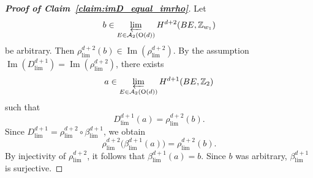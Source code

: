 \documentclass[aps,prx,reprint,superscriptaddress,twocolumn,amsmath,amssymb,amsfonts, nofootinbib]{revtex4-2}
\newcommand{\Z}{\mathbb{Z}}
\theoremstyle{apsstyle}
\begin{document}
\begin{proof}[\textnormal{\textbf{Proof of Claim~\ref{claim:imD_equal_imrho}}}]
Let
\begin{equation}
b\in  \varprojlim_{E\in\mathcal A_2(\mathrm{O}(d))} H^{d+2}(BE,\Z_{w_1})
\end{equation}
be arbitrary. Then $ \rho_{\lim}^{d+2}(b) \in \operatorname{Im}(\rho_{\lim}^{d+2})$.
By the assumption $\operatorname{Im}(D_{\lim}^{d+1}) = \operatorname{Im}(\rho_{\lim}^{d+2})$, there exists
\begin{equation}
a\in  \varprojlim_{E\in\mathcal A_2(\mathrm{O}(d))} H^{d+1}(BE,\Z_2)
\end{equation}
such that
\begin{equation}
D_{\lim}^{d+1}(a) = \rho_{\lim}^{d+2}(b).
\end{equation}
Since $D_{\lim}^{d+1} = \rho_{\lim}^{d+2}\circ \beta_{\lim}^{d+1}$,
we obtain
\begin{equation}
\rho_{\lim}^{d+2}\bigl(\beta_{\lim}^{d+1}(a)\bigr) = \rho_{\lim}^{d+2}(b).
\end{equation}
By injectivity of $\rho_{\lim}^{d+2}$, it follows that $\beta_{\lim}^{d+1}(a)=b$.
Since $b$ was arbitrary, $\beta_{\lim}^{d+1}$ is surjective.
\end{proof}

\bigskip
\end{document}
